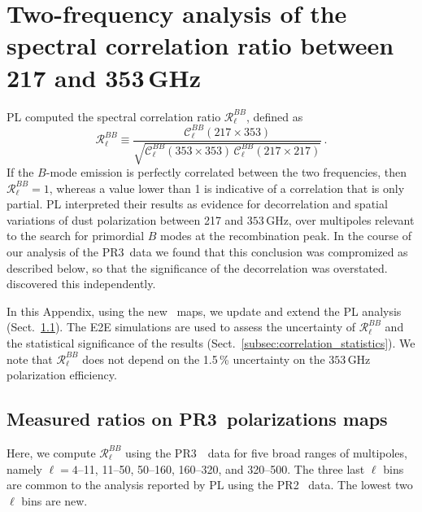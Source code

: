 \documentclass[longauth,traditabstract]{aa}
\newcommand{\PR}{PR3}
\begin{document}
\section{Two-frequency analysis of the spectral correlation ratio between 217 and 353\,GHz}
\label{appendix:pdf_Rell}

PL computed the spectral correlation ratio $\mathcal{R}_{\ell}^{BB}$, defined as
%
\begin{equation}
\mathcal{R}_{\ell}^{BB} \equiv \frac{\mathcal{C}^{BB}_{\ell} (217\times353)}
{\sqrt{\mathcal{C}^{BB}_{\ell}(353\times353) \,
 \mathcal{C}^{BB}_{\ell} (217\times217)}} \, .
\label{eq:correlation_ratio}
\end{equation}
%
If the $B$-mode emission is perfectly 
correlated between the two frequencies, then $\mathcal{R}_{\ell}^{BB}= 1$, whereas a value lower than 1 is indicative of a correlation that is only partial. PL interpreted their results as evidence for decorrelation
and spatial variations of dust polarization 
between 217 and $353\,$GHz, over multipoles relevant to the search for 
primordial $B$ modes at the recombination peak.
In the course of our analysis of the \PR\ data we found that this conclusion was compromized as described below, so that the significance of the decorrelation was overstated.
\citet{Sheehy17} discovered this independently.

In this Appendix, using the new \Planck\ maps, we update and extend the PL analysis (Sect.~\ref{subsec:correlation_ratio}).  The E2E simulations are used to assess the uncertainty of $\mathcal{R}_{\ell}^{BB}$ and the statistical significance of the results (Sect.~\ref{subsec:correlation_statistics}).  We 
note that $\mathcal{R}_{\ell}^{BB}$ does not depend on the 1.5\,\% uncertainty on the $353\,$GHz polarization efficiency.


\subsection{Measured ratios on \PR\ polarizations maps}
\label{subsec:correlation_ratio}

Here, we compute 
$\mathcal{R}_{\ell}^{BB}$ using the \PR\ \Planck\ data for five broad ranges of multipoles, namely $\ell = 4$--11, 11--50, 50--160, 160--320,
and 320--500. The three last $\ell$ bins are common to the analysis reported by PL using the PR2 \Planck\ data.  The lowest two $\ell$ bins are new.
\end{document}
